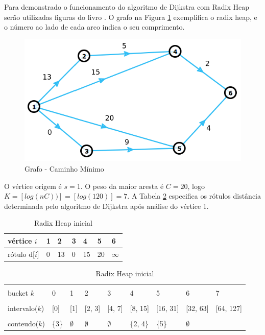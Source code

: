 Para demonstrado o funcionamento do algoritmo de Dijkstra com Radix Heap serão utilizadas figuras do livro \cite{bookahuja}.
O grafo na Figura \ref{fig:grafoRadix} exemplifica o radix heap, e o número ao lado de cada arco indica o seu comprimento.
\FloatBarrier
\begin{figure}[htbp]
\centering
 \includegraphics[width=.65\textwidth]{chapters/fig/grafoRadix.png}
\caption{Grafo - Caminho Mínimo}
\label{fig:grafoRadix}
\end{figure}
\FloatBarrier
O vértice origem é $s = 1$. O peso da maior aresta é $C = 20$, logo $K = [log(nC))] = [log(120)] = 7$.
A Tabela \ref{tab:initialradixheap} especifica os rótulos distância determinada pelo algoritmo de Dijkstra
após análise do vértice 1.
\FloatBarrier
\begin{table}[htbp]
	\centering
	\begin{tabular}{l l l l l l l}
	\toprule
	vértice $i$ & 1 & 2 & 3 & 4 & 5 & 6\\
	\midrule
	rótulo d[$i$] & 0 & 13 & 0 & 15 & 20 & $\infty$ \\
	\bottomrule
	\end{tabular}
	
	\centering
	\begin{tabular}{l l l l l l l l l}
	\toprule
	\\bucket $k$ & 0 & 1 & 2 & 3 & 4 & 5 & 6 & 7\\
	\midrule
	\\intervalo($k$) & [0] & [1] & [2, 3] & [4, 7] & [8, 15] & [16, 31] & [32, 63] & [64, 127]\\
	\\conteudo($k$) & \{3\} & $\emptyset$ & $\emptyset$ & $\emptyset$ & \{2, 4\} & \{5\} & $\emptyset$ & \\
	\bottomrule
	\end{tabular}
\caption{Radix Heap inicial}
 \label{tab:initialradixheap}
\end{table}

